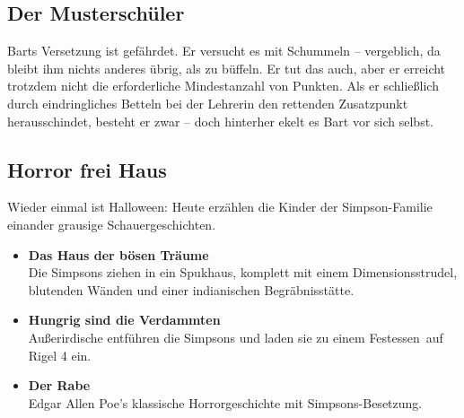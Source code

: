 	
\subsection{Der Musterschüler}
Barts Versetzung ist gefährdet. Er versucht es mit Schummeln -- vergeblich, da bleibt ihm nichts anderes übrig, als zu büffeln. Er tut das auch, aber er erreicht trotzdem nicht die erforderliche Mindestanzahl von Punkten. Als er schließlich durch eindringliches Betteln bei der Lehrerin den rettenden Zusatzpunkt herausschindet, besteht er zwar -- doch hinterher ekelt es Bart vor sich selbst.

	
\subsection{Horror frei Haus}\label{7F04}
Wieder einmal ist Halloween: Heute erzählen die Kinder der Simpson-Familie einander grausige Schauergeschichten. 
\begin{itemize}
	\item \textbf{Das Haus der bösen Träume}\\ Die Simpsons ziehen in ein Spukhaus, komplett mit einem Dimensionsstrudel, blutenden Wänden und einer indianischen Begräbnisstätte.
	\item \textbf{Hungrig sind die Verdammten}\\ Außerirdische entführen die Simpsons und laden sie zu einem \glqq Festessen\grqq\ auf Rigel 4 ein.
	\item \textbf{Der Rabe}\\ Edgar Allen Poe's klassische Horrorgeschichte mit Simpsons-Besetzung.
\end{itemize}


